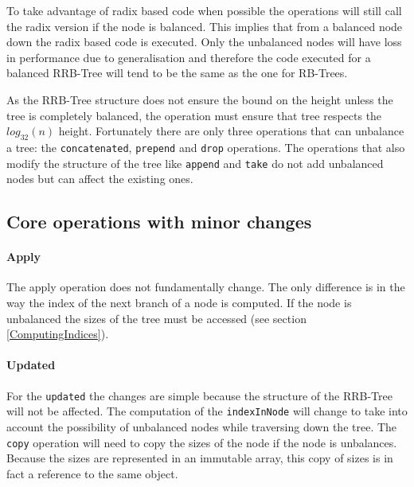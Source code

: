 To take advantage of radix based code when possible the operations will still call the radix version if the node is balanced. This implies that from a balanced node down the radix based code is executed. Only the unbalanced nodes will have loss in performance due to generalisation and therefore the code executed for a balanced RRB-Tree will tend to be the same as the one for RB-Trees.

As the RRB-Tree structure does not ensure the bound on the height unless the tree is completely balanced, the operation must ensure that tree respects the $log_{32}(n)$ height. Fortunately there are only three operations that can unbalance a tree: the \texttt{concatenated}, \texttt{prepend} and \texttt{drop} operations. The operations that also modify the structure of the tree like \texttt{append} and \texttt{take} do not add unbalanced nodes but can affect the existing ones.

\subsection{Core operations with minor changes}

\paragraph{Apply}
The apply operation does not fundamentally change. The only difference is in the way the index of the next branch of a node is computed. If the node is unbalanced the sizes of the tree must be accessed (see section \ref{ComputingIndices}).



\paragraph{Updated}
For the \texttt{updated} the changes are simple because the structure of the RRB-Tree will not be affected. The computation of the \texttt{indexInNode} will change to take into account the possibility of unbalanced nodes while traversing down the tree. The \texttt{copy} operation will need to copy the sizes of the node if the node is unbalances. Because the sizes are represented in an immutable array, this copy of sizes is in fact a reference to the same object.


